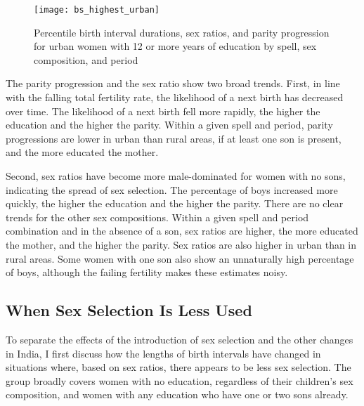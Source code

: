 \documentclass[12pt,letterpaper]{article}
\begin{document}

\begin{figure}
\centering
\texttt{[image: bs\_highest\_urban]}
\caption{Percentile birth interval durations, sex ratios, and parity progression  
for urban women with 12 or more years of education by spell, sex composition, and period}
\label{fig:spacing_highest_urban}
\end{figure}


The parity progression and the sex ratio show two broad trends.
First, 
in line with the falling total fertility rate, the likelihood of a next birth 
has decreased over time.
The likelihood of a next birth fell more rapidly, the higher the education and the 
higher the parity.
Within a given spell and period, parity progressions are lower in urban than rural areas, 
if at least one son is present, and the more educated the mother.


Second, sex ratios have become more male-dominated for women with no sons, indicating the spread 
of sex selection. 
The percentage of boys increased more quickly, the higher the education and the higher the parity. 
There are no clear trends for the other sex compositions. 
Within a given spell and period combination and in the absence of a son, sex ratios are higher, 
the more educated the mother, and the higher the parity. Sex ratios are also higher in urban than 
in rural areas.
Some women with one son also show an unnaturally high percentage of boys, although the 
failing fertility makes these estimates noisy.


\subsection{When Sex Selection Is Less Used}

To separate the effects of the introduction of sex selection and the other changes in
India, I first discuss how the lengths of birth intervals have changed in situations where, 
based on sex ratios, there appears to be less sex selection.
The group broadly covers women with no education, regardless of their children's sex 
composition, and women with any education who have one or two sons already.
\end{document}
